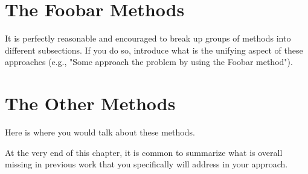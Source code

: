 \section{The Foobar Methods}

It is perfectly reasonable and encouraged to break up groups of methods into different subsections.  If you do so, introduce what is the unifying aspect of these approaches (e.g., "Some approach the problem by using the Foobar method").

\section{The Other Methods}

Here is where you would talk about these methods.

At the very end of this chapter, it is common to summarize what is overall missing in previous work that you specifically will address in your approach.